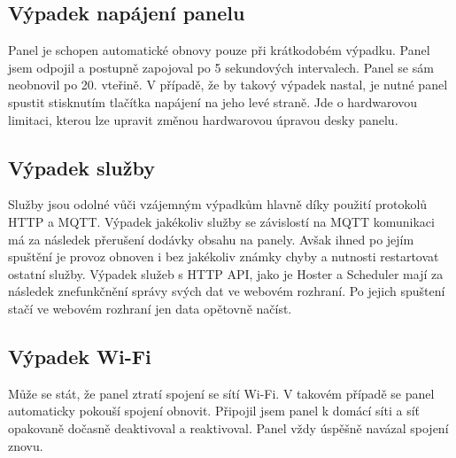 \subsection{Výpadek napájení panelu}
Panel je schopen automatické obnovy pouze při krátkodobém výpadku. Panel jsem odpojil a postupně zapojoval po 5 sekundových intervalech. Panel se sám neobnovil po 20. vteřině. V případě, že by takový výpadek nastal, je nutné panel spustit stisknutím tlačítka napájení na jeho levé straně. Jde o hardwarovou limitaci, kterou lze upravit změnou hardwarovou úpravou desky panelu\cite{Inkplate10hardwareSchematicsGerber}.

\subsection{Výpadek služby}
Služby jsou odolné vůči vzájemným výpadkům hlavně díky použití protokolů HTTP a MQTT. Výpadek jakékoliv služby se závislostí na MQTT komunikaci má za následek přerušení dodávky obsahu na panely. Avšak ihned po jejím spuštění je provoz obnoven i bez jakékoliv známky chyby a nutnosti restartovat ostatní služby. Výpadek služeb s HTTP API, jako je Hoster a Scheduler mají za následek znefunkčnění správy svých dat ve webovém rozhraní. Po jejich spuštení stačí ve webovém rozhraní jen 
 data opětovně načíst. 

\subsection{Výpadek Wi-Fi}
Může se stát, že panel ztratí spojení se sítí Wi-Fi. V takovém případě se panel automaticky pokouší spojení obnovit. Připojil jsem panel k domácí síti a síť opakovaně dočasně deaktivoval a reaktivoval. Panel vždy úspěšně navázal spojení znovu.

